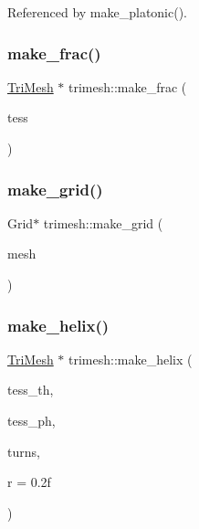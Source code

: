 Referenced by make\+\_\+platonic().

\mbox{\label{namespacetrimesh_a6e1d422eedb285d1081f85b1af2f6ba3}} 
\subsubsection{\texorpdfstring{make\+\_\+frac()}{make\_frac()}}
{\footnotesize\ttfamily \hyperlink{classtrimesh_1_1TriMesh}{Tri\+Mesh} $\ast$ trimesh\+::make\+\_\+frac (\begin{DoxyParamCaption}\item[{int}]{tess }\end{DoxyParamCaption})}

\mbox{\label{namespacetrimesh_ad6dfef32ed982206d691d6d94ad3190b}} 
\subsubsection{\texorpdfstring{make\+\_\+grid()}{make\_grid()}}
{\footnotesize\ttfamily Grid$\ast$ trimesh\+::make\+\_\+grid (\begin{DoxyParamCaption}\item[{\hyperlink{classtrimesh_1_1TriMesh}{Tri\+Mesh} $\ast$}]{mesh }\end{DoxyParamCaption})}

\mbox{\label{namespacetrimesh_ab8ffaaf32764c4d2e2af4ac42f3b7e2c}} 
\subsubsection{\texorpdfstring{make\+\_\+helix()}{make\_helix()}}
{\footnotesize\ttfamily \hyperlink{classtrimesh_1_1TriMesh}{Tri\+Mesh} $\ast$ trimesh\+::make\+\_\+helix (\begin{DoxyParamCaption}\item[{int}]{tess\+\_\+th,  }\item[{int}]{tess\+\_\+ph,  }\item[{float}]{turns,  }\item[{float}]{r = {\ttfamily 0.2f} }\end{DoxyParamCaption})}


